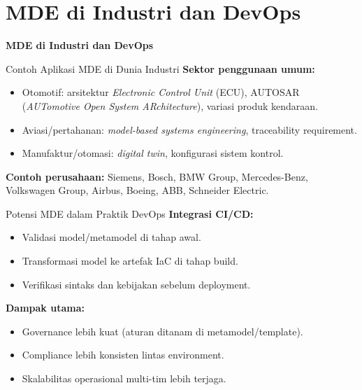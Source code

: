 \documentclass[aspectratio=169, table]{beamer}
\begin{document}
\section{MDE di Industri dan DevOps}
\begin{frame}{\hfill}
	\centering
	\Huge{\textbf{MDE di Industri dan DevOps}}
\end{frame}

\begin{frame}{Contoh Aplikasi MDE di Dunia Industri}
\vspace{8pt}
\textbf{Sektor penggunaan umum:}
\begin{itemize}
  \item Otomotif: arsitektur \textit{Electronic Control Unit} (ECU), AUTOSAR (\textit{AUTomotive Open System ARchitecture}), variasi produk kendaraan.
  \item Aviasi/pertahanan: \textit{model-based systems engineering}, traceability requirement.
  \item Manufaktur/otomasi: \textit{digital twin}, konfigurasi sistem kontrol.
\end{itemize}

\vspace{8pt}
\textbf{Contoh perusahaan:}
Siemens, Bosch, BMW Group, Mercedes-Benz, Volkswagen Group, Airbus,
Boeing, ABB, Schneider Electric.
\end{frame}

\begin{frame}{Potensi MDE dalam Praktik DevOps}
\vspace{8pt}
\textbf{Integrasi CI/CD:}
\begin{itemize}
  \item Validasi model/metamodel di tahap awal.
  \item Transformasi model ke artefak IaC di tahap build.
  \item Verifikasi sintaks dan kebijakan sebelum deployment.
\end{itemize}

\vspace{8pt}
\textbf{Dampak utama:}
\begin{itemize}
  \item Governance lebih kuat (aturan ditanam di metamodel/template).
  \item Compliance lebih konsisten lintas environment.
  \item Skalabilitas operasional multi-tim lebih terjaga.
\end{itemize}
\end{frame}
\end{document}
